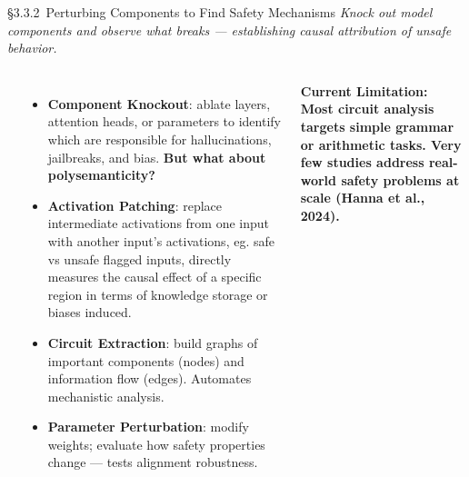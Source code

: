 \begin{frame}{\S3.3.2\ Perturbing Components to Find Safety Mechanisms}
  {\footnotesize\itshape Knock out model components and observe what breaks --- establishing causal attribution of unsafe behavior.}
  \vspace{0.3em}
  \begin{columns}[T]
    {\small\bfseries{}}
    \begin{itemize}\scriptsize\setlength\itemsep{4pt}
      \item \textbf{Component Knockout}: ablate layers, attention heads, or parameters to identify which are responsible for hallucinations, jailbreaks, and bias.
      \textbf{But what about polysemanticity?}
      \item \textbf{Activation Patching}: replace intermediate activations from one input with another input's activations, eg. safe vs unsafe flagged inputs, directly measures the causal effect of a specific region in terms of knowledge storage or biases induced.
      \item \textbf{Circuit Extraction}: build graphs of important components (nodes) and information flow (edges). Automates mechanistic analysis.
      \item \textbf{Parameter Perturbation}: modify weights; evaluate how safety properties change --- tests alignment robustness.
    \end{itemize}
    \vspace{0.2em}
    \begin{ucrwarn}
      \scriptsize\bfseries Current Limitation:\\[2pt]
      \normalfont\scriptsize
      Most circuit analysis targets simple grammar or arithmetic tasks. Very few studies address real-world safety problems at scale (Hanna et al., 2024).
    \end{ucrwarn}


\end{columns}
\end{frame}
